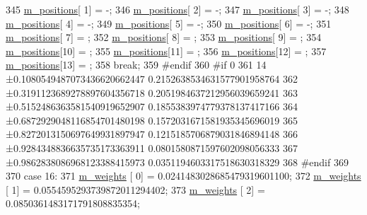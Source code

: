 \begin{DoxyCode}
345       \hyperlink{class_q_u_e_s_o_1_1_base1_d_quadrature_aeda387c028c3ba89ea0f9637a2234212}{m\_positions}[ 1] = -;
346       \hyperlink{class_q_u_e_s_o_1_1_base1_d_quadrature_aeda387c028c3ba89ea0f9637a2234212}{m\_positions}[ 2] = -;
347       \hyperlink{class_q_u_e_s_o_1_1_base1_d_quadrature_aeda387c028c3ba89ea0f9637a2234212}{m\_positions}[ 3] = -;
348       \hyperlink{class_q_u_e_s_o_1_1_base1_d_quadrature_aeda387c028c3ba89ea0f9637a2234212}{m\_positions}[ 4] = -;
349       \hyperlink{class_q_u_e_s_o_1_1_base1_d_quadrature_aeda387c028c3ba89ea0f9637a2234212}{m\_positions}[ 5] = -;
350       \hyperlink{class_q_u_e_s_o_1_1_base1_d_quadrature_aeda387c028c3ba89ea0f9637a2234212}{m\_positions}[ 6] = -;
351       \hyperlink{class_q_u_e_s_o_1_1_base1_d_quadrature_aeda387c028c3ba89ea0f9637a2234212}{m\_positions}[ 7] =  ;
352       \hyperlink{class_q_u_e_s_o_1_1_base1_d_quadrature_aeda387c028c3ba89ea0f9637a2234212}{m\_positions}[ 8] =  ;
353       \hyperlink{class_q_u_e_s_o_1_1_base1_d_quadrature_aeda387c028c3ba89ea0f9637a2234212}{m\_positions}[ 9] =  ;
354       \hyperlink{class_q_u_e_s_o_1_1_base1_d_quadrature_aeda387c028c3ba89ea0f9637a2234212}{m\_positions}[10] =  ;
355       \hyperlink{class_q_u_e_s_o_1_1_base1_d_quadrature_aeda387c028c3ba89ea0f9637a2234212}{m\_positions}[11] =  ;
356       \hyperlink{class_q_u_e_s_o_1_1_base1_d_quadrature_aeda387c028c3ba89ea0f9637a2234212}{m\_positions}[12] =  ;
357       \hyperlink{class_q_u_e_s_o_1_1_base1_d_quadrature_aeda387c028c3ba89ea0f9637a2234212}{m\_positions}[13] =  ;
358     \textcolor{keywordflow}{break};
359 \textcolor{preprocessor}{#endif}
360 \textcolor{preprocessor}{}\textcolor{preprocessor}{#if 0}
361 \textcolor{preprocessor}{}    14 ±0.1080549487073436620662447 0.2152638534631577901958764
362     ±0.3191123689278897604356718 0.2051984637212956039659241
363     ±0.5152486363581540919652907 0.1855383974779378137417166
364     ±0.6872929048116854701480198 0.1572031671581935345696019
365     ±0.8272013150697649931897947 0.1215185706879031846894148
366     ±0.9284348836635735173363911 0.0801580871597602098056333
367     ±0.9862838086968123388415973 0.0351194603317518630318329
368 #endif
369 
370     \textcolor{keywordflow}{case} 16:
371       \hyperlink{class_q_u_e_s_o_1_1_base1_d_quadrature_a7117fec020a8098d1c22b604268bad93}{m\_weights}  [ 0] =  0.0241483028685479319601100;
372       \hyperlink{class_q_u_e_s_o_1_1_base1_d_quadrature_a7117fec020a8098d1c22b604268bad93}{m\_weights}  [ 1] =  0.0554595293739872011294402;
373       \hyperlink{class_q_u_e_s_o_1_1_base1_d_quadrature_a7117fec020a8098d1c22b604268bad93}{m\_weights}  [ 2] =  0.0850361483171791808835354;

\end{DoxyCode}
